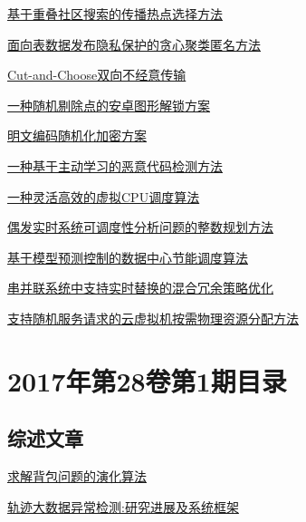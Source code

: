 \documentclass[a4paper]{article}
\begin{document}
\href{http://www.jos.org.cn/ch/reader/create_pdf.aspx?file_no=5117&year_id=2017&quarter_id=2&falg=1}{基于重叠社区搜索的传播热点选择方法}

\href{http://www.jos.org.cn/ch/reader/create_pdf.aspx?file_no=5015&year_id=2017&quarter_id=2&falg=1}{面向表数据发布隐私保护的贪心聚类匿名方法}

\href{http://www.jos.org.cn/ch/reader/create_pdf.aspx?file_no=5019&year_id=2017&quarter_id=2&falg=1}{Cut-and-Choose双向不经意传输}

\href{http://www.jos.org.cn/ch/reader/create_pdf.aspx?file_no=5023&year_id=2017&quarter_id=2&falg=1}{一种随机剔除点的安卓图形解锁方案}

\href{http://www.jos.org.cn/ch/reader/create_pdf.aspx?file_no=5048&year_id=2017&quarter_id=2&falg=1}{明文编码随机化加密方案}

\href{http://www.jos.org.cn/ch/reader/create_pdf.aspx?file_no=5061&year_id=2017&quarter_id=2&falg=1}{一种基于主动学习的恶意代码检测方法}

\href{http://www.jos.org.cn/ch/reader/create_pdf.aspx?file_no=5059&year_id=2017&quarter_id=2&falg=1}{一种灵活高效的虚拟CPU调度算法}

\href{http://www.jos.org.cn/ch/reader/create_pdf.aspx?file_no=5025&year_id=2017&quarter_id=2&falg=1}{偶发实时系统可调度性分析问题的整数规划方法}

\href{http://www.jos.org.cn/ch/reader/create_pdf.aspx?file_no=5026&year_id=2017&quarter_id=2&falg=1}{基于模型预测控制的数据中心节能调度算法}

\href{http://www.jos.org.cn/ch/reader/create_pdf.aspx?file_no=5031&year_id=2017&quarter_id=2&falg=1}{串并联系统中支持实时替换的混合冗余策略优化}

\href{http://www.jos.org.cn/ch/reader/create_pdf.aspx?file_no=5054&year_id=2017&quarter_id=2&falg=1}{支持随机服务请求的云虚拟机按需物理资源分配方法}


\section{\textbf{2017年第28卷第1期目录}}
\subsection{综述文章}
\href{http://www.jos.org.cn/ch/reader/create_pdf.aspx?file_no=5139&year_id=2017&quarter_id=1&falg=1}{求解背包问题的演化算法}

\href{http://www.jos.org.cn/ch/reader/create_pdf.aspx?file_no=5151&year_id=2017&quarter_id=1&falg=1}{轨迹大数据异常检测:研究进展及系统框架}
\end{document}
